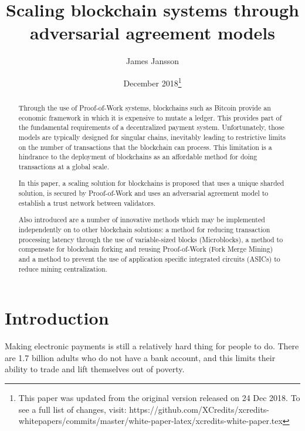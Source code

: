 \documentclass[a4paper,12pt]{article}
\begin{document}
\title{Scaling blockchain systems through adversarial agreement models}
\author{James Jansson}
\date{December 2018\footnote{This paper was updated from the original version released on 24 Dec 2018. To see a full list of changes, visit: https://github.com/XCredits/xcredits-whitepapers/commits/master/white-paper-latex/xcredits-white-paper.tex}} 
\maketitle


\begin{abstract}
Through the use of Proof-of-Work systems, blockchains such as Bitcoin provide an economic framework in which it is expensive to mutate a ledger. This provides part of the fundamental requirements of a decentralized payment system. Unfortunately, those models are typically designed for singular chains, inevitably leading to restrictive limits on the number of transactions that the blockchain can process. This limitation is a hindrance to the deployment of blockchains as an affordable method for doing transactions at a global scale. 

In this paper, a scaling solution for blockchains is proposed that uses a unique sharded solution, is secured by Proof-of-Work and uses an adversarial agreement model to establish a trust network between validators.

Also introduced are a number of innovative methods which may be implemented independently on to other blockchain solutions: a method for reducing transaction processing latency through the use of variable-sized blocks (Microblocks), a method to compensate for blockchain forking and reusing Proof-of-Work (Fork Merge Mining) and a method to prevent the use of application specific integrated circuits (ASICs) to reduce mining centralization. 

\end{abstract}




\newpage

\tableofcontents

\newpage

\section{Introduction}
Making electronic payments is still a relatively hard thing for people to do. There are 1.7 billion adults who do not have a bank account, and this limits their ability to trade and lift themselves out of poverty.
\end{document}
